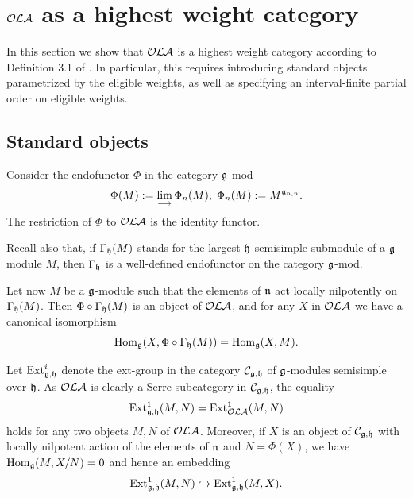 \documentclass[12pt]{amsart}
\makeatletter
\def\mathfrak{\frak}
\def\mathcal{\cal}
\def\@putname#1#2#3#4{\def\@@ref{#3}\let\old@bf\bf
        \def\bf##1{\old@bf\if?\noexpand##1?{#4}\else##1\fi}%
        #1{#2}%
        \let\bf\old@bf}
\def\@putname#1#2#3#4{\def\@@ref{#3}\let\old@bf\bf    %
        \let\old@reset@font\reset@font                  %
        \def\bf##1{\old@bf\if?\noexpand##1?{#4}\else##1\fi}%
        \def\reset@font##1##2{\old@reset@font##1\if?\noexpand##2?{#4}\else##2\fi}#1{#2}%
        \let\bf\old@bf\let\reset@font\old@reset@font}
\let\my@cite=\cite
\def\cite#1{\@putname\my@cite{#1}{\@citeb}{\tiny\rm\@@ref}}
\theoremstyle{plain} %
\numberwithin{equation}{section}
\theoremstyle{definition}
\theoremstyle{remark}
\theoremstyle{plain} %
\newcommand{\fg}{\mathfrak{g}}
\newcommand{\fh}{\mathfrak{h}}
\makeatother
\begin{document}
\section{$\mathcal{OLA}$ as a highest weight category}
In this section we show that $\mathcal{OLA}$ is a highest weight category according to Definition 3.1 of \cite{CPS}. In particular, this requires introducing standard objects parametrized by the eligible weights, as well as specifying an interval-finite partial order on  eligible  weights. 

\subsection{Standard objects} 

Consider the endofunctor $\Phi$ in the category $\fg$-$\mathrm{mod}$
$$\Phi(M):=\lim_{\longrightarrow} \Phi_n(M),\;\Phi_n(M):=M^{\fg_{n,n}}.$$
The restriction of $\Phi$ to $\mathcal{OLA}$ is the identity functor.

Recall also that, if $\Gamma_{\fh}(M)$ stands for the largest $\fh$-semisimple submodule of a $\fg$-module $M$, then $\Gamma_{\fh}$ is a well-defined endofunctor
on the category $\fg$-mod.

 Let now $M$ be a $\mathfrak g$-module such that the elements of $\mathfrak{n}$ act locally nilpotently on $\Gamma_{\fh}(M)$. Then $\Phi\circ\Gamma_{\mathfrak h}(M)$ is an object of $\mathcal{OLA}$, and
for any $X$ in $\mathcal{OLA}$ we have a canonical isomorphism 
\begin{equation}\label{tag}
\operatorname{Hom}_{\mathfrak g}(X,\Phi\circ \Gamma_{\mathfrak h} (M))=\operatorname{Hom}_{\mathfrak g}(X,M).
\end{equation}


Let $\operatorname{Ext}_{\fg,\fh}^i$ denote the ext-group in the category $\mathcal C_{\fg,\fh}$ of $\fg$-modules semisimple over $\fh$. As $\mathcal{OLA}$ is clearly
a Serre subcategory in $\mathcal C_{\fg,\fh}$, the equality
\begin{equation}\label{tag1}
  \operatorname{Ext}^1_{\fg,\fh}(M,N)=\operatorname{Ext}^1_{\mathcal{OLA}}(M,N)
  \end{equation}
 holds for any two objects $M,N$ of $\mathcal{OLA}$.
Moreover, if $X$ is an object of $\mathcal C_{\fg,\fh}$ with locally nilpotent action of the elements of $\mathfrak n$ and $N=\Phi  (X)$, we have
$\operatorname{Hom}_{\fg}(M,X/N)=0$ and hence an embedding
\begin{equation}\label{tag2}
\operatorname{Ext}^1_{\fg,\fh}(M,N)\hookrightarrow\operatorname{Ext}^1_{\fg,\fh}(M,X).
\end{equation}
\end{document}
